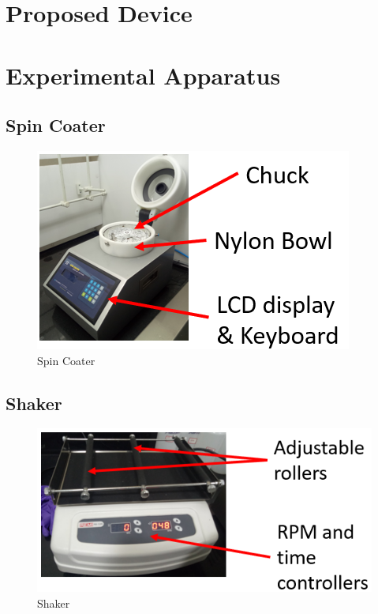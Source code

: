 \section{Proposed Device}
\section{Experimental Apparatus}
\subsection{Spin Coater}
\begin{figure}[H]
	\centering
		
		\includegraphics{4.png}
		\caption{Spin Coater}
\end{figure}
\subsection{Shaker}
\begin{figure}[H]
	\centering
		
		\includegraphics{5.png}
		\caption{Shaker}
\end{figure}
